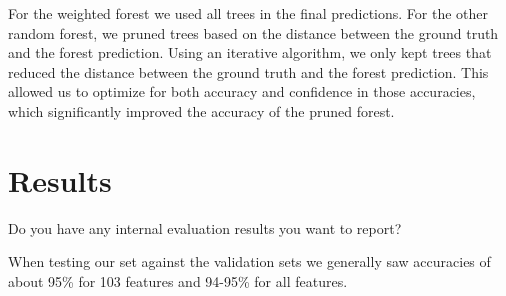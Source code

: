 \documentclass[10pt,a4paper]{article}
\begin{document}
For the weighted forest we used all trees in the final predictions.
For the other random forest, we pruned trees based on the distance between the ground truth and the forest prediction.
Using an iterative algorithm, we only kept trees that reduced the distance between the ground truth and the forest prediction.
This allowed us to optimize for both accuracy and confidence in those accuracies, which significantly improved the accuracy of the pruned forest.
\section{Results}
Do you have any internal evaluation results you want to report?

When testing our set against the validation sets we generally saw accuracies of about 95\% for 103 features and 94-95\% for all features.
\end{document}
